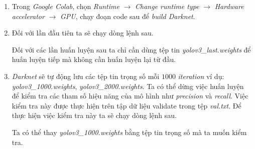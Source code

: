 \begin{enumerate}
	\item Trong \emph{Google Colab}, chọn \emph{Runtime} $\rightarrow$ \emph{Change runtime type} $\rightarrow$ \emph{Hardware accelerator} $\rightarrow$ \emph{GPU}, chạy đoạn code sau để \emph{build Darknet}.

\noindent{}

	\item Đối với lần đầu tiên ta sẽ chạy dòng lệnh sau.
	
\noindent{}	

	Đối với các lần huấn luyện sau ta chỉ cần dùng tệp tin \emph{yolov3{\_}last.weights} để huấn luyện tiếp mà không cần huấn luyện lại từ đầu.
	
\noindent{}

	\item \emph{Darknet} sẽ tự động lưu các tệp tin trọng số mỗi $1000$ \emph{iteration} ví dụ: \emph{yolov3{\_}1000.weights}, \emph{yolov3{\_}2000.weights}. Ta có thể dừng việc huấn luyện để kiểm tra các tham số hiệu năng của mô hình như \emph{precision} và \emph{recall}. Việc kiểm tra này được thực hiện trên tập dữ liệu validate trong tệp \emph{val.txt}. Để thực hiện việc kiểm tra này ta sẽ chạy dòng lệnh sau.
	
\noindent{}

	Ta có thể thay \emph{yolov3{\_}1000.weights} bằng tệp tin trọng số mà ta muốn kiểm tra.
\end{enumerate}

